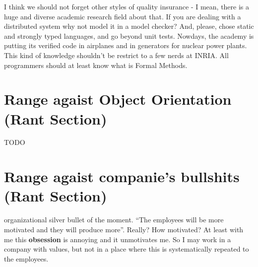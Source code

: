 \documentclass[11pt,a4paper,sans]{moderncv}
\begin{document}
I think we should not forget other styles of quality insurance - I mean, there
is a huge and diverse academic research field about that. If you are dealing
with a distributed system why not model it in a model checker? And, please,
chose static and strongly typed languages, and go beyond unit tests. Nowdays,
the academy is putting its verified code in airplanes and in generators for
nuclear power plants. This kind of knowledge shouldn't be restrict to a few nerds
at INRIA. All programmers should at least know what is Formal Methods.

\section{Range agaist Object Orientation (Rant Section)}
TODO

\section{Range agaist companie's bullshits (Rant Section)}
organizational silver bullet of the moment. ``The employees will be
more motivated and they will produce more''.  Really? How
motivated? At least with me this \textbf{obsession} is annoying and it
unmotivates me.  So I may work in a company with values, but not in a
place where this is systematically repeated to the employees.
\end{document}
